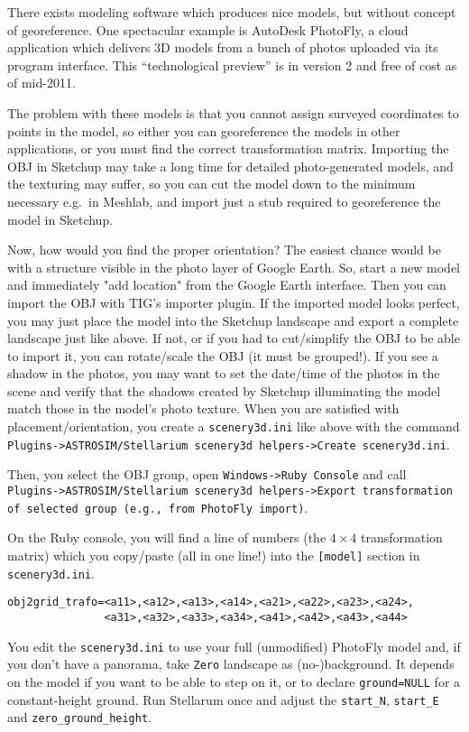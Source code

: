 \documentclass[a4paper]{article}
\newcommand{\filename}[1]{\texttt{#1}}
\newcommand{\cmd}[1]{\texttt{#1}}
\begin{document}
There exists modeling software which produces nice models, but without
concept of georeference. One spectacular example is AutoDesk PhotoFly,
a cloud application which delivers 3D models from a bunch of photos
uploaded via its program interface. This ``technological preview'' is
in version 2 and free of cost as of mid-2011.

The problem with these models is that you cannot assign surveyed
coordinates to points in the model, so either you can georeference the
models in other applications, or you must find the correct
transformation matrix.  Importing the OBJ in Sketchup may take a long
time for detailed photo-generated models, and the texturing may
suffer, so you can cut the model down to the minimum necessary e.g.\ in
Meshlab, and import just a stub required to georeference the model in
Sketchup. 

Now, how would you find the proper orientation? The easiest chance
would be with a structure visible in the photo layer of Google
Earth. So, start a new model and immediately "add location" from the
Google Earth interface. Then you can import the OBJ with TIG's importer
plugin.  If the imported model looks perfect, you may just place the
model into the Sketchup landscape and export a complete landscape just
like above. If not, or if you had to cut/simplify the OBJ to be able
to import it, you can rotate/scale the OBJ (it must be grouped!). If
you see a shadow in the photos, you may want to set the date/time of
the photos in the scene and verify that the shadows created by
Sketchup illuminating the model match those in the model's photo
texture. When you are satisfied with placement/orientation, you create
a \filename{scenery3d.ini} like above with the command
\cmd{Plugins->ASTROSIM/Stellarium scenery3d helpers->Create scenery3d.ini}.

Then, you select the OBJ group, open \cmd{Windows->Ruby Console} and call
\cmd{Plugins->ASTROSIM/Stellarium scenery3d helpers->Export transformation
of selected group (e.g., from PhotoFly import)}.

On the Ruby console, you will find a line of numbers (the $4\times4$ transformation matrix) which you
copy/paste (all in one line!) into the \filename{[model]} section in \filename{scenery3d.ini}. 
\begin{verbatim}
obj2grid_trafo=<a11>,<a12>,<a13>,<a14>,<a21>,<a22>,<a23>,<a24>,
               <a31>,<a32>,<a33>,<a34>,<a41>,<a42>,<a43>,<a44>
\end{verbatim}
You edit the \filename{scenery3d.ini} to use your full (unmodified)
PhotoFly model and, if you don't have a panorama, take \filename{Zero}
landscape as (no-)background. It depends on the model if you want to
be able to step on it, or to declare \verb|ground=NULL| for a
constant-height ground. Run Stellarum once and adjust the
\verb|start_N|, \verb|start_E| and \verb|zero_ground_height|.
\end{document}
